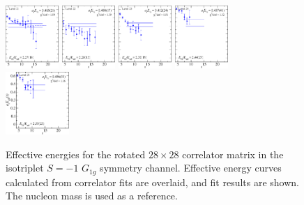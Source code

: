 \begin{figure}[H]
    \includegraphics[width=0.18\textwidth]{figures/sigmas/g1g/fits/fit_17.pdf}
    \includegraphics[width=0.18\textwidth]{figures/sigmas/g1g/fits/fit_2.pdf}
    \includegraphics[width=0.18\textwidth]{figures/sigmas/g1g/fits/fit_18.pdf}
    \includegraphics[width=0.18\textwidth]{figures/sigmas/g1g/fits/fit_25.pdf}\\[-0.35cm]
    \includegraphics[width=0.215\textwidth]{figures/sigmas/g1g/fits/fit_24.pdf}
    \caption[Effective energies for the rotated $28\times 28$ correlator matrix in the isotriplet $S=-1$ $G_{1g}$ symmetry channel.]{Effective energies for the rotated $28\times 28$ correlator matrix in the isotriplet $S=-1$ $G_{1g}$ symmetry channel. Effective energy curves calculated from correlator fits are overlaid, and fit results are shown. The nucleon mass is used as a reference.}\label{fig:g1g_fits}
\end{figure}

